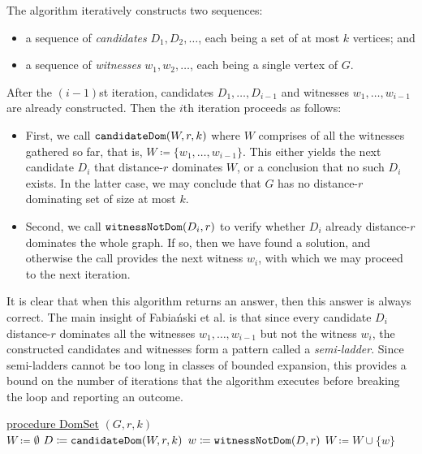 The algorithm iteratively constructs two sequences:
\begin{itemize}
	\item a sequence of \emph{candidates} $D_1,D_2,\ldots$, each being a set of at most $k$ vertices; and 
	\item a sequence of \emph{witnesses} $w_1,w_2,\ldots$, each being a single vertex of $G$.
\end{itemize}
After the $(i-1)$st iteration, candidates $D_1,\ldots,D_{i-1}$ and witnesses $w_1,\ldots,w_{i-1}$ are already constructed. Then the $i$th iteration proceeds as follows:
\begin{itemize}
	\item First, we call $\mathtt{candidateDom}(W,r,k)$ where $W$ comprises of all the  witnesses gathered so far, that is, $W\coloneqq \{w_1,\ldots,w_{i-1}\}$. This either yields the next candidate $D_i$ that distance-$r$ dominates $W$, or a conclusion that no such $D_i$ exists. In the latter case, we may conclude that $G$ has no distance-$r$ dominating set of size at most $k$.
	\item Second, we call $\mathtt{witnessNotDom}(D_i,r)$ to verify whether $D_i$ already distance-$r$ dominates the whole graph. If so, then we have found a solution, and otherwise the call provides the next witness $w_i$, with which we may proceed to the next iteration.
\end{itemize}
It is clear that when this algorithm returns an answer, then this answer is always correct. The main insight of Fabia\'nski et al. is that since every candidate $D_i$ distance-$r$ dominates all the witnesses $w_1,\ldots,w_{i-1}$ but not the witness $w_i$, the constructed candidates and witnesses form a pattern called a \emph{semi-ladder}. Since semi-ladders cannot be too long in classes of bounded expansion, this provides a bound on the number of iterations that the algorithm executes before breaking the loop and reporting an outcome.


\begin{algorithm}
	
	\nonl
	\underline{procedure DomSet} $(G,r,k)$\\
	\medskip
	$W \coloneqq \emptyset$\;
	\Repeat
	{
		$D\coloneqq \mathtt{candidateDom}(W,r,k)$\;
		{
			\KwRet{$\bot$} \;
		}
		$w \coloneqq \mathtt{witnessNotDom}(D,r)$ \;
		{
			 \;
		}
		$W \coloneqq W \cup \{ w \}$ \;
	}
	\caption{Semi-ladder algorithm for distance-$r$ dominating set of size $k$ in a graph $G$}\label{alg:1}
\end{algorithm}

